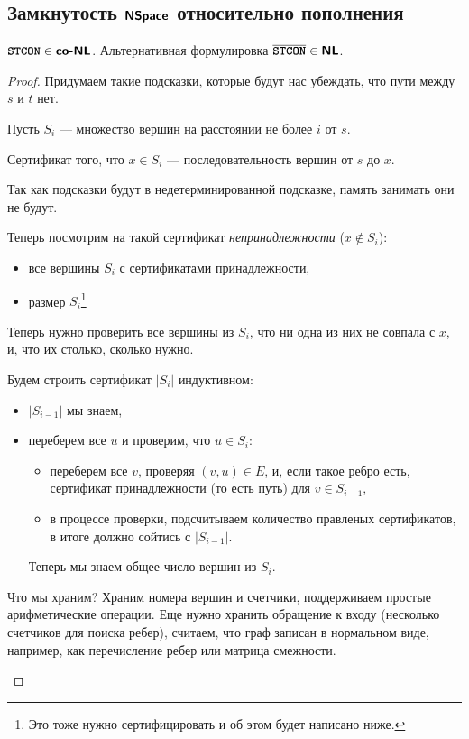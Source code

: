 \subsection{Замкнутость $\textmd{\textbf{\textsf{NSpace}}}$ относительно пополнения}
\begin{thm}
     $ {\textbf{\texttt{STCON}}} \in \textmd{\textbf{\textsf{co-NL}}}$. Альтернативная формулировка $ \overline{{\textbf{\texttt{STCON}}}} \in \textmd{\textbf{\textsf{NL}}}$. 
\end{thm}
\begin{proof}
	Придумаем такие подсказки, которые будут нас убеждать, что пути между $ s$ и $ t$ нет.

	Пусть $ S_i$ --- множество вершин на расстоянии не более $ i$ от $ s$.

	Сертификат того, что $ x \in S_i$ --- последовательность вершин от $ s $ до $ x$.
	
	Так как подсказки будут в недетерминированной подсказке, память занимать они не будут.

	Теперь посмотрим на такой сертификат \textit{непринадлежности} ($ x \notin S_i$):
	\begin{itemize}[noitemsep]
		\item все вершины  $ S_i$ с сертификатами принадлежности,
		\item размер $ S_i$\footnote{Это тоже нужно сертифицировать и об этом будет написано ниже.}
	\end{itemize}

	Теперь нужно проверить все вершины из $ S_i$, что ни одна из них не совпала с $ x$, и, что их столько, сколько нужно.

	Будем строить сертификат $ \lvert S_i \rvert $ индуктивном:
	\begin{itemize}[noitemsep]
		\item $ \lvert S_{i-1} \rvert $ мы знаем,
		\item переберем все $ u$ и проверим, что  $ u \in S_i$:
			\begin{itemize}[noitemsep]
				\item переберем все $ v $, проверяя $ (v, u) \in E$, и, если такое ребро есть, сертификат принадлежности (то есть путь) для $ v \in S_{i-1}$,
				\item в процессе проверки, подсчитываем количество правленых сертификатов, в итоге должно сойтись с $ \lvert S_{i-1} \rvert $.
			\end{itemize}
			Теперь мы знаем общее число вершин из $ S_{i}$.
	\end{itemize}
	\begin{note}
		Что мы храним? Храним номера вершин и счетчики, поддерживаем простые арифметические операции. Еще нужно хранить обращение к входу (несколько счетчиков для поиска ребер), считаем, что граф записан в нормальном виде, например, как перечисление ребер или матрица смежности.
	\end{note}
\end{proof}

